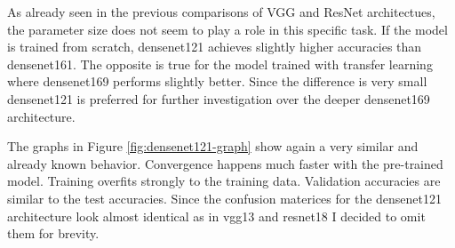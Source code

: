 \begin{table}[h] \centering
{}
\caption{Hyper parameters for densenet121 optimized with SigOpt. First row shows hyperparameters training the architecture from scratch. Second row used pre-trained weights from ImageNet}
\label{tbl:Densenet121_overview}
\end{table}

As already seen in the previous comparisons of VGG and ResNet architectues, the parameter size does not seem to play a role in this specific task. If the model is trained from scratch, densenet121 achieves slightly higher accuracies than densenet161. The opposite is true for the model trained with transfer learning where densenet169 performs slightly better. Since the difference is very small densenet121 is preferred for further investigation over the deeper densenet169 architecture.

The graphs in Figure \ref{fig:densenet121-graph} show again a very similar and already known behavior. Convergence happens much faster with the pre-trained model. Training overfits strongly to the training data. Validation accuracies are similar to the test accuracies. Since the confusion materices for the densenet121 architecture look almost identical as in vgg13 and resnet18 I decided to omit them for brevity.

